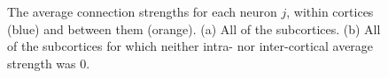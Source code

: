 \begin{figure}[ht]
  \centering

  \caption[Average strengths]{The average connection strengths for each neuron $j$, within cortices (blue) and between them (orange).
    (a) All of the subcortices.
    (b) All of the subcortices for which neither intra- nor inter-cortical average strength was 0.
  }
  \label{fig:average_strengths}
\end{figure}

